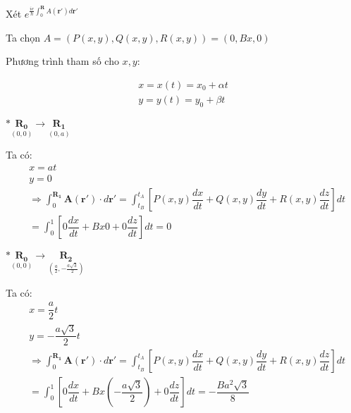 \documentclass{article}
\begin{document}
\noindent Xét $e^{\frac{ie}{\hbar}\int_{0}^{\mathbf{R}}A(\mathbf{r'})d\mathbf{r'}}$

\noindent Ta chọn $A = \left(P(x,y),Q(x,y),R(x,y)\right) = (0,Bx,0)$

\noindent Phương trình tham số cho $x,y$:

\begin{align*}
    x = x(t) = x_0 + \alpha t \\
    y = y(t) = y_0 + \beta t
\end{align*}

\clearpage

\noindent $\ast \underset{(0,0)}{\mathbf{R_0}}  \longrightarrow \underset{(0,a)}{\mathbf{R_1}}$

Ta có:
\begin{align}
     & x = at \nonumber                                                                                                                                                                                 \\
     & y = 0 \nonumber                                                                                                                                                                                  \\
     & \Rightarrow \int_{0}^{\mathbf{R_1}} \mathbf{A}(\mathbf{r'})\cdot d\mathbf{r'} =  \int_{t_B}^{t_A} \left[ P(x,y)\dfrac{dx}{dt} + Q(x,y)\dfrac{dy}{dt} + R(x,y)\dfrac{dz}{dt} \right] dt \nonumber \\
     & = \int_{0}^{1} \left[ 0\dfrac{dx}{dt} + Bx0 + 0\dfrac{dz}{dt} \right] dt = 0 \nonumber
\end{align}

\noindent $\ast \underset{(0,0)}{\mathbf{R_0}}  \longrightarrow \underset{(\frac{a}{2},-\frac{a\sqrt{3}}{2})}{\mathbf{R_2}}$

Ta có:
\begin{align}
     & x = \dfrac{a}{2}t \nonumber                                                                                                                                                                      \\
     & y = -\dfrac{a\sqrt{3}}{2}t \nonumber                                                                                                                                                             \\
     & \Rightarrow \int_{0}^{\mathbf{R_1}} \mathbf{A}(\mathbf{r'})\cdot d\mathbf{r'} =  \int_{t_B}^{t_A} \left[ P(x,y)\dfrac{dx}{dt} + Q(x,y)\dfrac{dy}{dt} + R(x,y)\dfrac{dz}{dt} \right] dt \nonumber \\
     & = \int_{0}^{1} \left[ 0\dfrac{dx}{dt} + Bx\left(-\dfrac{a\sqrt{3}}{2}\right) + 0\dfrac{dz}{dt} \right] dt = -\dfrac{Ba^2\sqrt{3}}{8} \nonumber
\end{align}
\end{document}
